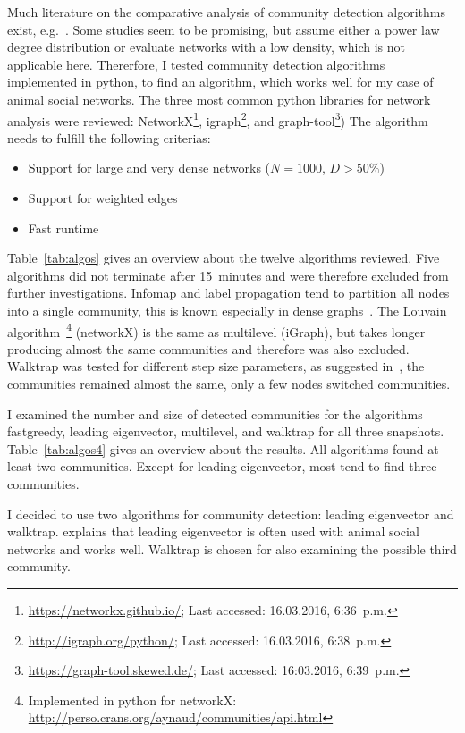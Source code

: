 Much literature on the comparative analysis of community detection algorithms exist, e.g.~\cite{yang2016comparative, harenberg2014community}. Some studies seem to be promising, but assume either a power law degree distribution or
evaluate networks with a low density, which is not applicable here.
Thererfore, I tested community detection algorithms implemented in python, to find an algorithm, which works well for my case of animal social networks. The three most common python libraries for network analysis were reviewed: NetworkX\footnote{\url{https://networkx.github.io/}; Last accessed: 16.03.2016, 6:36~p.m.}, igraph\footnote{\url{http://igraph.org/python/}; Last accessed: 16.03.2016, 6:38~p.m.}, and graph-tool\footnote{\url{https://graph-tool.skewed.de/}; Last accessed: 16:03.2016, 6:39~p.m.})
The algorithm needs to fulfill the following criterias:

\begin{itemize}
\item Support for large and very dense networks ($N=1000$, $D>50\%$)
\item Support for weighted edges
\item Fast runtime
\end{itemize}

Table~\ref{tab:algos} gives an overview about the twelve algorithms reviewed. Five algorithms did not terminate after 15~minutes and were therefore excluded from further investigations. Infomap and label propagation tend to partition all nodes into a single community, this is known especially in dense graphs~\cite{yang2016comparative, fortunato2010community}.
The Louvain algorithm~\footnote{Implemented in python for networkX: \url{http://perso.crans.org/aynaud/communities/api.html}} (networkX) is the same as multilevel (iGraph), but takes longer producing almost the same communities and therefore was also excluded. Walktrap was tested for different step size parameters, as suggested in~\cite{pons2005computing}, the communities remained almost the same, only a few nodes switched communities.

I examined the number and size of detected communities for the algorithms fastgreedy, leading eigenvector, multilevel, and walktrap for all three snapshots. Table~\ref{tab:algos4} gives an overview about the results.
All algorithms found at least two communities.
Except for leading eigenvector, most tend to find three communities.

I decided to use two algorithms for community detection: leading eigenvector and walktrap. \textcite{farine2015constructing} explains that leading eigenvector is often used with animal social networks and works well. Walktrap is chosen for also examining the possible third community.

